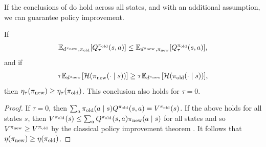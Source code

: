 \documentclass[\main/thesis.tex]{subfiles}
\begin{document}
If the conclusions of  do hold across all states, and with an additional assumption, we can guarantee policy improvement. 
\begin{corollary}\label{cor:fkl-pi}
If 
\begin{align*}
    \mathbb{E}_{d^{\pi_\mathrm{new}}, {\pi_\mathrm{old}}}[ Q^{\pi_\mathrm{old}}_\tau(s, a)]\leq \mathbb{E}_{d^{\pi_\mathrm{new}}, {\pi_\mathrm{new}}}[Q^{\pi_\mathrm{old}}_\tau(s, a)],
\end{align*}
and if 
\begin{align*}
    \tau \mathbb{E}_{d^{\pi_\mathrm{new}}}[\mathcal{H}({\pi_\mathrm{new}}(\cdot \mid s))] \geq \tau \mathbb{E}_{d^{\pi_\mathrm{new}}}[\mathcal{H}({\pi_\mathrm{old}}(\cdot \mid s))],
\end{align*}
then $\eta_\tau({\pi_\mathrm{new}}) \geq \eta_\tau({\pi_\mathrm{old}})$. This conclusion also holds for $\tau = 0$.
\end{corollary}
\begin{proof}
If $\tau = 0$, then $\sum_a {\pi_\mathrm{old}}(a \mid s) Q^{{\pi_\mathrm{old}}}(s, a) = V^{{\pi_\mathrm{old}}}(s)$. If the above holds for all states $s$, then $V^{{\pi_\mathrm{old}}}(s) \leq \sum_a Q^{{\pi_\mathrm{old}}}(s, a) {\pi_\mathrm{new}}(a \mid s)$ for all states and so $V^{{\pi_\mathrm{new}}} \geq V^{{\pi_\mathrm{old}}}$ by the classical policy improvement theorem \citep{sutton2018reinforcement}. It follows that $\eta({\pi_\mathrm{new}}) \geq \eta({\pi_\mathrm{old}})$.


\end{proof}
\end{document}
